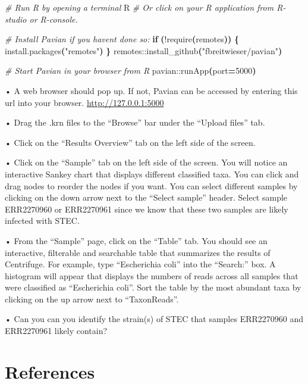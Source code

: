 \documentclass[
]{book}
\newenvironment{Shaded}{\begin{snugshade}}{\end{snugshade}}
\newcommand{\CommentTok}[1]{\textcolor[rgb]{0.56,0.35,0.01}{\textit{#1}}}
\newcommand{\ControlFlowTok}[1]{\textcolor[rgb]{0.13,0.29,0.53}{\textbf{#1}}}
\newcommand{\ErrorTok}[1]{\textcolor[rgb]{0.64,0.00,0.00}{\textbf{#1}}}
\newcommand{\ExtensionTok}[1]{#1}
\newcommand{\KeywordTok}[1]{\textcolor[rgb]{0.13,0.29,0.53}{\textbf{#1}}}
\newcommand{\NormalTok}[1]{#1}
\newcommand{\OperatorTok}[1]{\textcolor[rgb]{0.81,0.36,0.00}{\textbf{#1}}}
\newcommand{\StringTok}[1]{\textcolor[rgb]{0.31,0.60,0.02}{#1}}
\newcommand{\VariableTok}[1]{\textcolor[rgb]{0.00,0.00,0.00}{#1}}
\begin{document}
\begin{Shaded}
\begin{Highlighting}[]
\CommentTok{\# Run R by opening a terminal}
\ExtensionTok{R}
\CommentTok{\# Or click on your R application from R{-}studio or R{-}console.}

\CommentTok{\# Install Pavian if you haven\textquotesingle{}t done so:}
\ControlFlowTok{if} \KeywordTok{(}\ExtensionTok{!require}\ErrorTok{(}\ExtensionTok{remotes}\KeywordTok{))} \KeywordTok{\{} \ExtensionTok{install.packages}\ErrorTok{(}\StringTok{"remotes"}\KeywordTok{)} \KeywordTok{\}}
\ExtensionTok{remotes::install\_github}\ErrorTok{(}\StringTok{"fbreitwieser/pavian"}\KeywordTok{)}

\CommentTok{\# Start Pavian in your browser from R}
\ExtensionTok{pavian::runApp}\ErrorTok{(}\VariableTok{port}\OperatorTok{=}\NormalTok{5000}\KeywordTok{)}
\end{Highlighting}
\end{Shaded}

• A web browser should pop up. If not, Pavian can be accessed by entering this url into your browser. \url{http://127.0.0.1:5000}

• Drag the .krn files to the ``Browse'' bar under the ``Upload files'' tab.

• Click on the ``Results Overview'' tab on the left side of the screen.

• Click on the ``Sample'' tab on the left side of the screen. You will notice an interactive Sankey chart that displays different
classified taxa. You can click and drag nodes to reorder the nodes if you want. You can select different samples by clicking
on the down arrow next to the ``Select sample'' header. Select sample ERR2270960 or ERR2270961 since we know that
these two samples are likely infected with STEC.

• From the ``Sample'' page, click on the ``Table'' tab. You should see an interactive, filterable and searchable table that
summarizes the results of Centrifuge. For example, type ``Escherichia coli'' into the ``Search:'' box. A histogram will appear
that displays the numbers of reads across all samples that were classified as ``Escherichia coli''. Sort the table by the most
abundant taxa by clicking on the up arrow next to ``TaxonReads''.

• Can you can you identify the strain(s) of STEC that samples ERR2270960 and ERR2270961 likely contain?

\hypertarget{references}{%
\section{References}\label{references}}
\end{document}
